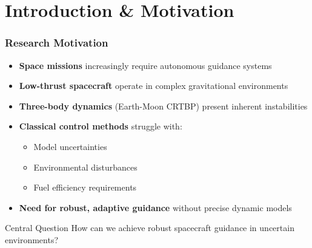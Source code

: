 \section{Introduction \& Motivation}

\begin{frame}
    \frametitle{Research Motivation}

    \begin{itemize}
        \item \textbf{Space missions} increasingly require autonomous guidance systems
        \item \textbf{Low-thrust spacecraft} operate in complex gravitational environments
        \item \textbf{Three-body dynamics} (Earth-Moon CRTBP) present inherent instabilities
        \item \textbf{Classical control methods} struggle with:
        \begin{itemize}
            \item Model uncertainties
            \item Environmental disturbances
            \item Fuel efficiency requirements
        \end{itemize}
        \item \textbf{Need for robust, adaptive guidance} without precise dynamic models
    \end{itemize}

    
    \begin{minipage}
        {0.93\textwidth}
            \begin{alertblock}{Central Question}
    \centering How can we achieve robust spacecraft guidance in uncertain environments?
    \end{alertblock}
    \end{minipage}
\end{frame}

